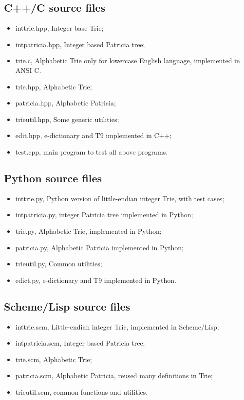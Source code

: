 \documentclass{article}
\begin{document}
\subsection{C++/C source files}

\begin{itemize}
\item inttrie.hpp, Integer base Trie;
\item intpatricia.hpp, Integer based Patricia tree;
\item trie.c, Alphabetic Trie only for lowercase English language,
implemented in ANSI C.
\item trie.hpp, Alphabetic Trie;
\item patricia.hpp, Alphabetic Patricia;
\item trieutil.hpp, Some generic utilities;
\item edit.hpp, e-dictionary and T9 implemented in C++;
\item test.cpp, main program to test all above programs.
\end{itemize}

\subsection{Python source files}

\begin{itemize}
\item inttrie.py, Python version of little-endian integer Trie, with
test cases;
\item intpatricia.py, integer Patricia tree implemented in Python;
\item trie.py, Alphabetic Trie, implemented in Python;
\item patricia.py, Alphabetic Patricia implemented in Python;
\item trieutil.py, Common utilities;
\item edict.py, e-dictionary and T9 implemented in Python.
\end{itemize}

\subsection{Scheme/Lisp source files}

\begin{itemize}
\item inttrie.scm, Little-endian integer Trie, implemented in Scheme/Lisp;
\item intpatricia.scm, Integer based Patricia tree;
\item trie.scm, Alphabetic Trie;
\item patricia.scm, Alphabetic Patricia, reused many definitions in
Trie;
\item trieutil.scm, common functions and utilities.
\end{itemize}
\end{document}
